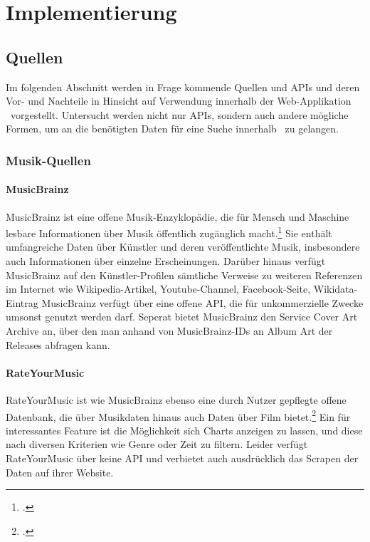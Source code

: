 \chapter{Implementierung}
\label{cha:implementierung}


\section{Quellen}
Im folgenden Abschnitt werden in Frage kommende Quellen und APIs und deren Vor- und Nachteile in Hinsicht auf Verwendung innerhalb der Web-Applikation \arbeitstitel \ vorgestellt. Untersucht werden nicht nur APIs, sondern auch andere mögliche Formen, um an die benötigten Daten für eine Suche innerhalb \arbeitstitel \ zu gelangen.


\subsection{Musik-Quellen}
\subsubsection{MusicBrainz}
MusicBrainz ist eine offene Musik-Enzyklopädie, die für Mensch und Maschine lesbare Informationen über Musik öffentlich zugänglich macht.\footcite[Vgl.][]{musicbrainz} Sie enthält umfangreiche Daten über Künstler und deren veröffentlichte Musik, insbesondere auch Informationen über einzelne Erscheinungen. Darüber hinaus verfügt MusicBrainz auf den Künstler-Profilen sämtliche Verweise zu weiteren Referenzen im Internet wie Wikipedia-Artikel, Youtube-Channel, Facebook-Seite, Wikidata-Eintrag \uvm MusicBrainz verfügt über eine offene API, die für unkommerzielle Zwecke umsonst genutzt werden darf. Seperat bietet MusicBrainz den Service Cover Art Archive an, über den man anhand von MusicBrainz-IDs an Album Art der Releases abfragen kann.

\subsubsection{RateYourMusic}
RateYourMusic ist wie MusicBrainz ebenso eine durch Nutzer gepflegte offene Datenbank, die über Musikdaten hinaus auch Daten über Film bietet.\footcite[Vgl.][]{rym} Ein für \textbf{\arbeitstitel} interessantes Feature ist die Möglichkeit sich Charts anzeigen zu lassen, und diese nach diversen Kriterien wie Genre oder Zeit zu filtern. Leider verfügt RateYourMusic über keine API und verbietet auch ausdrücklich das Scrapen der Daten auf ihrer Website.

